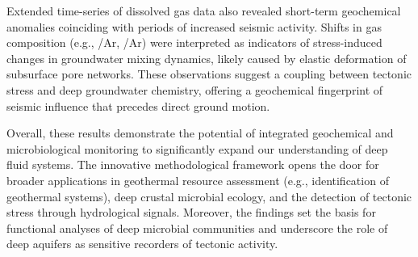 Extended time-series of dissolved gas data also revealed short-term geochemical anomalies coinciding with periods of increased seismic activity.
Shifts in gas composition (e.g., /Ar, /Ar) were interpreted as indicators of stress-induced changes in groundwater mixing dynamics, likely caused by elastic deformation of subsurface pore networks.
These observations suggest a coupling between tectonic stress and deep groundwater chemistry, offering a geochemical fingerprint of seismic influence that precedes direct ground motion.

Overall, these results demonstrate the potential of integrated geochemical and microbiological monitoring to significantly expand our understanding of deep fluid systems.
The innovative methodological framework opens the door for broader applications in geothermal resource assessment (e.g., identification of geothermal systems), deep crustal microbial ecology, and the detection of tectonic stress through hydrological signals.
Moreover, the findings set the basis for functional analyses of deep microbial communities and underscore the role of deep aquifers as sensitive recorders of tectonic activity.

\endgroup


\cleardoublepage%


\begingroup
\let\clearpage\relax
\let\cleardoublepage\relax
\let\cleardoublepage\relax


